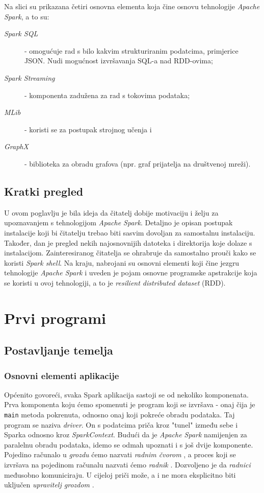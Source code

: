 \documentclass[times, utf8, zavrsni]{fer}
\begin{document}
Na slici su prikazana četiri osnovna elementa koja čine osnovu tehnologije \emph{Apache Spark}, a to su: 
\begin{description}
\item[\emph{Spark SQL}] - omogućuje rad s bilo kakvim strukturiranim podatcima, primjerice JSON. Nudi mogućnost izvršavanja SQL-a nad RDD-ovima;
\item[\emph{Spark Streaming}] - komponenta zadužena za rad s tokovima podataka;
\item[\emph{MLib}] - koristi se za postupak strojnog učenja i 
\item[\emph{GraphX}] - biblioteka za obradu grafova (npr. graf prijatelja na društvenoj mreži).
\end{description}

\section{Kratki pregled}
U ovom poglavlju je bila ideja da čitatelj dobije motivaciju i želju za upoznavanjem s tehnologijom \emph{Apache Spark}. Detaljno je opisan postupak instalacije koji bi čitatelju trebao biti sasvim dovoljan za samostalnu instalaciju. Također, dan je pregled nekih najosnovnijih datoteka i direktorija koje dolaze s instalacijom. Zainteresiranog čitatelja se ohrabruje da samostalno prouči kako se koristi \emph{Spark shell}. Na kraju, nabrojani su osnovni elementi koji čine jezgru tehnologije \emph{Apache Spark} i uveden je pojam osnovne programske apstrakcije koja se koristi u ovoj tehnologiji, a to je \emph{resilient distributed dataset} (RDD).

\chapter{Prvi programi}
\section{Postavljanje temelja}
\subsection{Osnovni elementi aplikacije}
Općenito govoreći, svaka Spark aplikacija sastoji se od nekoliko komponenata. Prva komponenta koju ćemo spomenuti je program koji se izvršava - onaj čija je \texttt{main} metoda pokrenuta, odnosno onaj koji pokreće obradu podataka. Taj program se naziva \emph{driver}. On s podatcima priča kroz "tunel" između sebe i Sparka odnosno kroz \emph{SparkContext}. Budući da je \emph{Apache Spark} namijenjen za paralelnu obradu podataka, idemo se odmah upoznati i s još dvije komponente. Pojedino računalo u \emph{grozdu}  ćemo nazvati \emph{radnim čvorom} , a proces koji se izvršava na pojedinom računalu nazvati ćemo \emph{radnik} . Dozvoljeno je da \emph{radnici} međusobno komuniciraju. U cijeloj priči može, a i ne mora eksplicitno biti uključen \emph{upravitelj grozdom} .
\end{document}
